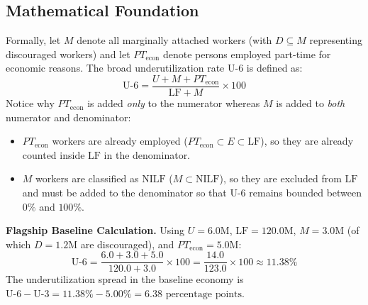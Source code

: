 \documentclass[11pt, a4paper]{article}
\begin{document}
\subsection*{Mathematical Foundation}
Formally, let $M$ denote all marginally attached workers (with $D \subseteq M$ representing discouraged workers) and let $PT_{\text{econ}}$ denote persons employed part-time for economic reasons. The broad underutilization rate U-6 is defined as:
\begin{equation}
  \text{U-6} = \frac{U + M + PT_{\text{econ}}}{\text{LF} + M} \times 100
  \label{eq:u6}
\end{equation}
Notice why $PT_{\text{econ}}$ is added \emph{only} to the numerator whereas $M$ is added to \emph{both} numerator and denominator:
\begin{itemize}[leftmargin=1.5em, itemsep=2pt]
  \item $PT_{\text{econ}}$ workers are already employed ($PT_{\text{econ}} \subset E \subset \text{LF}$), so they are already counted inside $\text{LF}$ in the denominator.
  \item $M$ workers are classified as $\text{NILF}$ ($M \subset \text{NILF}$), so they are excluded from $\text{LF}$ and must be added to the denominator so that U-6 remains bounded between $0\%$ and $100\%$.
\end{itemize}

\textbf{Flagship Baseline Calculation.} Using $U = 6.0\text{M}$, $\text{LF} = 120.0\text{M}$, $M = 3.0\text{M}$ (of which $D = 1.2\text{M}$ are discouraged), and $PT_{\text{econ}} = 5.0\text{M}$:
\[
  \text{U-6} = \frac{6.0 + 3.0 + 5.0}{120.0 + 3.0} \times 100 = \frac{14.0}{123.0} \times 100 \approx 11.38\%
\]
The underutilization spread in the baseline economy is $\text{U-6} - \text{U-3} = 11.38\% - 5.00\% = 6.38\text{ percentage points}$.
\end{document}
